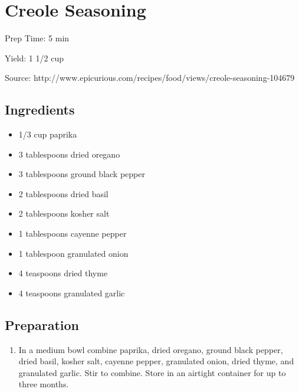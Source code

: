\section{Creole Seasoning}

\begin{center}
Prep Time: 5 min

\noindent Yield: 1 1/2 cup

\vspace{1em}

Source: http://www.epicurious.com/recipes/food/views/creole-seasoning-104679
\end{center}

\subsection{Ingredients}
\begin{multicols}{2}
\begin{itemize}
    \item 1/3 cup paprika
    \item 3 tablespoons dried oregano
    \item 3 tablespoons ground black pepper
    \item 2 tablespoons dried basil
    \item 2 tablespoons kosher salt
    \item 1 tablespoons cayenne pepper
    \item 1 tablespoon granulated onion
    \item 4 teaspoons dried thyme
    \item 4 teaspoons granulated garlic
\end{itemize}
\end{multicols}

\subsection{Preparation}
\begin{enumerate}
    \item In a medium bowl combine paprika, dried oregano, ground black pepper, dried basil, kosher salt, cayenne pepper, granulated onion, dried thyme, and granulated garlic. Stir to combine. Store in an airtight container for up to three months.
\end{enumerate}
